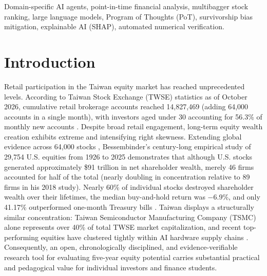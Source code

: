 \documentclass[conference]{IEEEtran}
\begin{document}
\begin{abstract}
\end{abstract}

\begin{IEEEkeywords}
Domain-specific AI agents, point-in-time financial analysis, multibagger stock ranking, large language models, Program of Thoughts (PoT), survivorship bias mitigation, explainable AI (SHAP), automated numerical verification.
\end{IEEEkeywords}

\section{Introduction}

Retail participation in the Taiwan equity market has reached unprecedented levels. According to Taiwan Stock Exchange (TWSE) statistics as of October 2026, cumulative retail brokerage accounts reached 14,827,469 (adding 64,000 accounts in a single month), with investors aged under 30 accounting for 56.3\% of monthly new accounts \cite{twse2026}. Despite broad retail engagement, long-term equity wealth creation exhibits extreme and intensifying right skewness. Extending global evidence across 64,000 stocks \cite{bessembinder2023}, Bessembinder's century-long empirical study of 29,754 U.S. equities from 1926 to 2025 \cite{bessembinder2026} demonstrates that although U.S. stocks generated approximately \$91 trillion in net shareholder wealth, merely 46 firms accounted for half of the total (nearly doubling in concentration relative to 89 firms in his 2018 study). Nearly 60\% of individual stocks destroyed shareholder wealth over their lifetimes, the median buy-and-hold return was $-$6.9\%, and only 41.17\% outperformed one-month Treasury bills \cite{bessembinder2026}. Taiwan displays a structurally similar concentration: Taiwan Semiconductor Manufacturing Company (TSMC) alone represents over 40\% of total TWSE market capitalization, and recent top-performing equities have clustered tightly within AI hardware supply chains \cite{twse2026}. Consequently, an open, chronologically disciplined, and evidence-verifiable research tool for evaluating five-year equity potential carries substantial practical and pedagogical value for individual investors and finance students.
\end{document}
